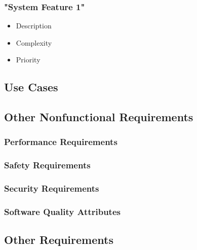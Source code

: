 	\subsubsection{ "System Feature 1"}
	\begin{itemize}
		\item  Description
		\item  Complexity
		\item  Priority
	\end{itemize}

\pagebreak

\subsection{ Use Cases}

\pagebreak

\subsection{ Other Nonfunctional Requirements}
\subsubsection{Performance Requirements}
\subsubsection{ Safety Requirements}
\subsubsection{ Security Requirements}
\subsubsection{ Software Quality Attributes}

\subsection{ Other Requirements}